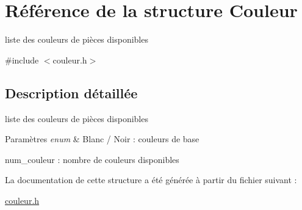 \hypertarget{struct_couleur}{\section{Référence de la structure Couleur}
\label{struct_couleur}
}


liste des couleurs de pièces disponibles  




{\ttfamily \#include $<$couleur.\-h$>$}



\subsection{Description détaillée}
liste des couleurs de pièces disponibles 


\begin{DoxyParams}{Paramètres}
{\em enum} & Blanc / Noir \-: couleurs de base \par
 num\-\_\-couleur \-: nombre de couleurs disponibles \\
\hline
\end{DoxyParams}


La documentation de cette structure a été générée à partir du fichier suivant \-:\begin{DoxyCompactItemize}
\item 
\hyperlink{couleur_8h}{couleur.\-h}\end{DoxyCompactItemize}
